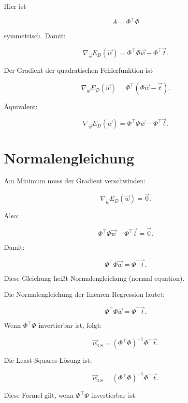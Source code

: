 Hier ist

\[
    A = \Phi^{\top}\Phi
\]

symmetrisch.
Damit:

\[
    \nabla_{\vec{w}}E_D(\vec{w})
    =
    \Phi^{\top}\Phi\vec{w}
    -
    \Phi^{\top}\vec{t}.
\]

\begin{definitionbox}
Der Gradient der quadratischen Fehlerfunktion ist

\[
    \nabla_{\vec{w}}E_D(\vec{w})
    =
    \Phi^{\top}
    (
        \Phi\vec{w}-\vec{t}
    ).
\]

Äquivalent:

\[
    \nabla_{\vec{w}}E_D(\vec{w})
    =
    \Phi^{\top}\Phi\vec{w}
    -
    \Phi^{\top}\vec{t}.
\]
\end{definitionbox}

\section{Normalengleichung}

Am Minimum muss der Gradient verschwinden:

\[
    \nabla_{\vec{w}}E_D(\vec{w})
    =
    \vec{0}.
\]

Also:

\[
    \Phi^{\top}\Phi\vec{w}
    -
    \Phi^{\top}\vec{t}
    =
    \vec{0}.
\]

Damit:

\[
    \Phi^{\top}\Phi\vec{w}
    =
    \Phi^{\top}\vec{t}.
\]

Diese Gleichung heißt Normalengleichung (normal equation).

\begin{definitionbox}
Die Normalengleichung der linearen Regression lautet:

\[
    \Phi^{\top}\Phi\vec{w}
    =
    \Phi^{\top}\vec{t}.
\]
\end{definitionbox}

Wenn \(\Phi^{\top}\Phi\) invertierbar ist, folgt:

\[
    \vec{w}_{\mathrm{LS}}
    =
    (\Phi^{\top}\Phi)^{-1}
    \Phi^{\top}\vec{t}.
\]

\begin{conceptbox}
Die Least-Squares-Lösung ist:

\[
    \vec{w}_{\mathrm{LS}}
    =
    (\Phi^{\top}\Phi)^{-1}
    \Phi^{\top}\vec{t}.
\]

Diese Formel gilt, wenn \(\Phi^{\top}\Phi\) invertierbar ist.
\end{conceptbox}

